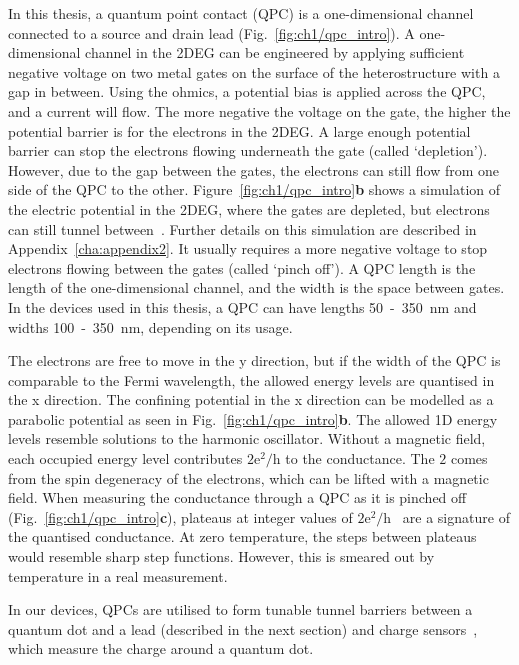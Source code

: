 In this thesis, a quantum point contact (QPC) is a one-dimensional channel connected to a source and drain lead (Fig.~\ref{fig:ch1/qpc_intro}). A one-dimensional channel in the 2DEG can be engineered by applying sufficient negative voltage on two metal gates on the surface of the heterostructure with a gap in between. Using the ohmics, a potential bias is applied across the QPC, and a current will flow. The more negative the voltage on the gate, the higher the potential barrier is for the electrons in the 2DEG. A large enough potential barrier can stop the electrons flowing underneath the gate (called `depletion'). However, due to the gap between the gates, the electrons can still flow from one side of the QPC to the other. Figure~\ref{fig:ch1/qpc_intro}\textbf{b} shows a simulation of the electric potential in the 2DEG, where the gates are depleted, but electrons can still tunnel between~\cite{Davies1995}. Further details on this simulation are described in Appendix~\ref{cha:appendix2}. It usually requires a more negative voltage to stop electrons flowing between the gates (called `pinch off'). A QPC length is the length of the one-dimensional channel, and the width is the space between gates. In the devices used in this thesis, a QPC can have lengths 50~-~\qty{350}{nm} and widths 100~-~\qty{350}{nm}, depending on its usage.

The electrons are free to move in the y direction, but if the width of the QPC is comparable to the Fermi wavelength, the allowed energy levels are quantised in the x direction. The confining potential in the x direction can be modelled as a parabolic potential as seen in Fig.~\ref{fig:ch1/qpc_intro}\textbf{b}. The allowed 1D energy levels resemble solutions to the harmonic oscillator. Without a magnetic field, each occupied energy level contributes $\mathrm{2e^2/h}$ to the conductance. The $2$ comes from the spin degeneracy of the electrons, which can be lifted with a magnetic field. When measuring the conductance through a QPC as it is pinched off (Fig.~\ref{fig:ch1/qpc_intro}\textbf{c}), plateaus at integer values of $\mathrm{2e^2/h}$~\cite{qpc_first_measurement} are a signature of the quantised conductance. At zero temperature, the steps between plateaus would resemble sharp step functions. However, this is smeared out by temperature in a real measurement.

In our devices, QPCs are utilised to form tunable tunnel barriers between a quantum dot and a lead (described in the next section) and charge sensors~\cite{cs_first_measurement}, which measure the charge around a quantum dot. 




